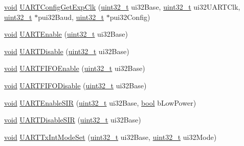 \begin{DoxyCompactItemize}
\item 
\hyperlink{usb__devapi_8h_afabf60e7f57651d6d595a02c75f07cd0}{void} \hyperlink{group__uart__api_ga14340c8b74b16af630653226007f2cce}{U\+A\+R\+T\+Config\+Get\+Exp\+Clk} (\hyperlink{_p_e___types_8h_a33594304e786b158f3fb30289278f5af}{uint32\+\_\+t} ui32\+Base, \hyperlink{_p_e___types_8h_a33594304e786b158f3fb30289278f5af}{uint32\+\_\+t} ui32\+U\+A\+R\+T\+Clk, \hyperlink{_p_e___types_8h_a33594304e786b158f3fb30289278f5af}{uint32\+\_\+t} $\ast$pui32\+Baud, \hyperlink{_p_e___types_8h_a33594304e786b158f3fb30289278f5af}{uint32\+\_\+t} $\ast$pui32\+Config)
\item 
\hyperlink{usb__devapi_8h_afabf60e7f57651d6d595a02c75f07cd0}{void} \hyperlink{group__uart__api_ga93ba793d082da8ceb2ddab3ddc650a35}{U\+A\+R\+T\+Enable} (\hyperlink{_p_e___types_8h_a33594304e786b158f3fb30289278f5af}{uint32\+\_\+t} ui32\+Base)
\item 
\hyperlink{usb__devapi_8h_afabf60e7f57651d6d595a02c75f07cd0}{void} \hyperlink{group__uart__api_ga24b7349b5fd44c56e552d2d3fa2e4057}{U\+A\+R\+T\+Disable} (\hyperlink{_p_e___types_8h_a33594304e786b158f3fb30289278f5af}{uint32\+\_\+t} ui32\+Base)
\item 
\hyperlink{usb__devapi_8h_afabf60e7f57651d6d595a02c75f07cd0}{void} \hyperlink{group__uart__api_gac6ea9357292a6a51f949d0d2cd85d95a}{U\+A\+R\+T\+F\+I\+F\+O\+Enable} (\hyperlink{_p_e___types_8h_a33594304e786b158f3fb30289278f5af}{uint32\+\_\+t} ui32\+Base)
\item 
\hyperlink{usb__devapi_8h_afabf60e7f57651d6d595a02c75f07cd0}{void} \hyperlink{group__uart__api_ga33ec41720030e24957edf7927174e1c5}{U\+A\+R\+T\+F\+I\+F\+O\+Disable} (\hyperlink{_p_e___types_8h_a33594304e786b158f3fb30289278f5af}{uint32\+\_\+t} ui32\+Base)
\item 
\hyperlink{usb__devapi_8h_afabf60e7f57651d6d595a02c75f07cd0}{void} \hyperlink{group__uart__api_ga7a49f55b28b43b69809866d46db02d32}{U\+A\+R\+T\+Enable\+S\+IR} (\hyperlink{_p_e___types_8h_a33594304e786b158f3fb30289278f5af}{uint32\+\_\+t} ui32\+Base, \hyperlink{_p_e___types_8h_a97a80ca1602ebf2303258971a2c938e2}{bool} b\+Low\+Power)
\item 
\hyperlink{usb__devapi_8h_afabf60e7f57651d6d595a02c75f07cd0}{void} \hyperlink{group__uart__api_gabb22356aed40380e7d862e5d0ca6cb89}{U\+A\+R\+T\+Disable\+S\+IR} (\hyperlink{_p_e___types_8h_a33594304e786b158f3fb30289278f5af}{uint32\+\_\+t} ui32\+Base)
\item 
\hyperlink{usb__devapi_8h_afabf60e7f57651d6d595a02c75f07cd0}{void} \hyperlink{group__uart__api_gae3b173446db0912f8d04dd1270833169}{U\+A\+R\+T\+Tx\+Int\+Mode\+Set} (\hyperlink{_p_e___types_8h_a33594304e786b158f3fb30289278f5af}{uint32\+\_\+t} ui32\+Base, \hyperlink{_p_e___types_8h_a33594304e786b158f3fb30289278f5af}{uint32\+\_\+t} ui32\+Mode)

\end{DoxyCompactItemize}

